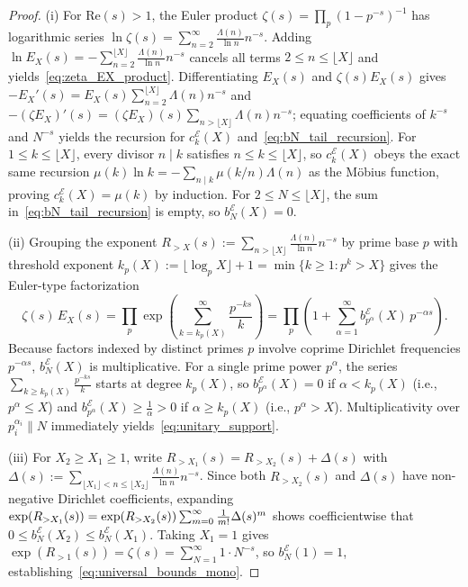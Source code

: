 \documentclass[11pt,reqno]{amsart}
\theoremstyle{definition}
\theoremstyle{remark}
\numberwithin{equation}{section}
\newcommand{\Rea}{\mathrm{Re}}
\newcommand{\fac}{\mathclose{\mathchar"0021}}
\begin{document}
\begin{proof}
(i) For $\Rea(s) > 1$, the Euler product $\zeta(s) = \prod_p (1 - p^{-s})^{-1}$ has logarithmic series $\ln\zeta(s) = \sum_{n=2}^{\infty} \frac{\Lambda(n)}{\ln n}n^{-s}$. Adding $\ln E_X(s) = -\sum_{n=2}^{\lfloor X\rfloor} \frac{\Lambda(n)}{\ln n}n^{-s}$ cancels all terms $2 \le n \le \lfloor X\rfloor$ and yields~\eqref{eq:zeta_EX_product}. Differentiating $E_X(s)$ and $\zeta(s)E_X(s)$ gives $-E_X'(s) = E_X(s)\sum_{n=2}^{\lfloor X\rfloor} \Lambda(n)n^{-s}$ and $-(\zeta E_X)'(s) = (\zeta E_X)(s)\sum_{n > \lfloor X\rfloor} \Lambda(n)n^{-s}$; equating coefficients of $k^{-s}$ and $N^{-s}$ yields the recursion for $c_k^{\mathcal{E}}(X)$ and~\eqref{eq:bN_tail_recursion}. For $1 \le k \le \lfloor X\rfloor$, every divisor $n \mid k$ satisfies $n \le k \le \lfloor X\rfloor$, so $c_k^{\mathcal{E}}(X)$ obeys the exact same recursion $\mu(k)\ln k = -\sum_{n \mid k} \mu(k/n)\Lambda(n)$ as the M\"obius function, proving $c_k^{\mathcal{E}}(X) = \mu(k)$ by induction. For $2 \le N \le \lfloor X\rfloor$, the sum in~\eqref{eq:bN_tail_recursion} is empty, so $b_N^{\mathcal{E}}(X) = 0$.

(ii) Grouping the exponent $R_{>X}(s) := \sum_{n > \lfloor X\rfloor} \frac{\Lambda(n)}{\ln n}n^{-s}$ by prime base $p$ with threshold exponent $k_p(X) := \lfloor\log_p X\rfloor + 1 = \min\{k \ge 1 : p^k > X\}$ gives the Euler-type factorization
\[
\zeta(s)\,E_X(s) = \prod_p \exp\!\left(\sum_{k = k_p(X)}^{\infty} \frac{p^{-ks}}{k}\right) = \prod_p \left(1 + \sum_{\alpha=1}^{\infty} b_{p^\alpha}^{\mathcal{E}}(X)\,p^{-\alpha s}\right).
\]
Because factors indexed by distinct primes $p$ involve coprime Dirichlet frequencies $p^{-\alpha s}$, $b_N^{\mathcal{E}}(X)$ is multiplicative. For a single prime power $p^\alpha$, the series $\sum_{k \ge k_p(X)} \frac{p^{-ks}}{k}$ starts at degree $k_p(X)$, so $b_{p^\alpha}^{\mathcal{E}}(X) = 0$ if $\alpha < k_p(X)$ (i.e., $p^\alpha \le X$) and $b_{p^\alpha}^{\mathcal{E}}(X) \ge \frac{1}{\alpha} > 0$ if $\alpha \ge k_p(X)$ (i.e., $p^\alpha > X$). Multiplicativity over $p_i^{\alpha_i} \parallel N$ immediately yields~\eqref{eq:unitary_support}.

(iii) For $X_2 \ge X_1 \ge 1$, write $R_{>X_1}(s) = R_{>X_2}(s) + \Delta(s)$ with $\Delta(s) := \sum_{\lfloor X_1\rfloor < n \le \lfloor X_2\rfloor} \frac{\Lambda(n)}{\ln n}n^{-s}$. Since both $R_{>X_2}(s)$ and $\Delta(s)$ have non-negative Dirichlet coefficients, expanding $\exp(R_{>X_1}(s)) = \exp(R_{>X_2}(s))\sum_{m=0}^{\infty} \frac{1}{m\fac}\Delta(s)^m$ shows coefficientwise that $0 \le b_N^{\mathcal{E}}(X_2) \le b_N^{\mathcal{E}}(X_1)$. Taking $X_1 = 1$ gives $\exp(R_{>1}(s)) = \zeta(s) = \sum_{N=1}^{\infty} 1\cdot N^{-s}$, so $b_N^{\mathcal{E}}(1) = 1$, establishing~\eqref{eq:universal_bounds_mono}.


\end{proof}
\end{document}
